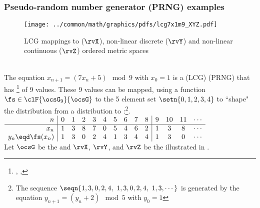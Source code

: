 \begin{tabstr}{0.75}
\subsubsection{Pseudo-random number generator (PRNG) examples}
\begin{figure}[h]
  \gsize%
  \centering%
  \texttt{[image: ../common/math/graphics/pdfs/lcg7x1m9\_XYZ.pdf]}%
  \caption{LCG mappings to  ($\rvX$), non-linear discrete ($\rvY$)
  and non-linear continuous ($\rvZ$) ordered metric spaces \label{fig:lcg7x1m9_xyz}}
\end{figure}
\begin{example}
\label{ex:lcg7x1m9_xyz}\mbox{}\\
The equation $x_{n+1}=(7x_n+5)\mod9$ with $x_0=1$ is a  (LCG) 
 (PRNG)
that has \footnote{
  ,
  ,
  }
of 9 values.
These 9 values can be mapped, using a   function $\fs\in\clF{\ocsG_9}{\ocsG}$ 
to the 5 element set $\setn{0,1,2,3,4}$ to ``shape" the distribution from a  distribution to 
:\footnote{The sequence $\seqn{1,3,0,2,4,\,\,1,3,0,2,4,\,\,1,3,\cdots}$
is generated by the equation $y_{n+1}=(y_n+2)\mod5$ with $y_0=1$}.
\\\indentx$\begin{array}{r|*{9}{c}|*{4}{c}}
    n             & 0 & 1 & 2 & 3 & 4 & 5 & 6 & 7 & 8    & 9 & 10 & 11 & \cdots\\\hline 
  x_n             & 1 & 3 & 8 & 7 & 0 & 5 & 4 & 6 & 2    & 1 &  3 &  8 & \cdots\\
  y_n\eqd\fs(x_n) & 1 & 3 & 0 & 2 & 4 & 1 & 3 & 4 & 4    & 1 &  3 &  0 & \cdots%
\end{array}$\\
Let $\ocsG$ be the  and 
$\rvX$, $\rvY$, and $\rvZ$ be the  
illustrated in .

\end{example}
\end{tabstr}
